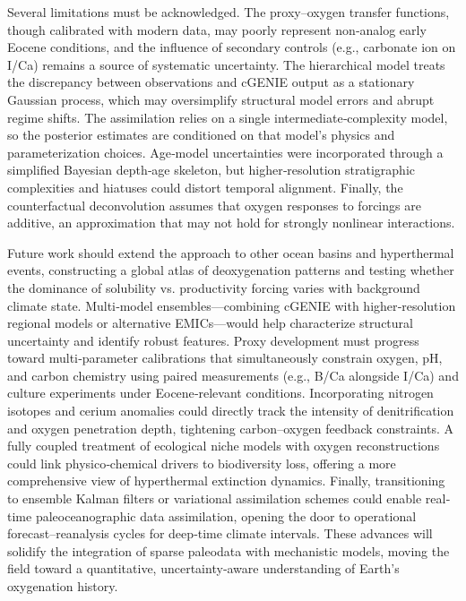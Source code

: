 \documentclass{article}
\begin{document}
Several limitations must be acknowledged. The proxy–oxygen transfer functions, though calibrated with modern data, may poorly represent non‐analog early Eocene conditions, and the influence of secondary controls (e.g., carbonate ion on I/Ca) remains a source of systematic uncertainty. The hierarchical model treats the discrepancy between observations and cGENIE output as a stationary Gaussian process, which may oversimplify structural model errors and abrupt regime shifts. The assimilation relies on a single intermediate‐complexity model, so the posterior estimates are conditioned on that model’s physics and parameterization choices. Age‐model uncertainties were incorporated through a simplified Bayesian depth‐age skeleton, but higher‐resolution stratigraphic complexities and hiatuses could distort temporal alignment. Finally, the counterfactual deconvolution assumes that oxygen responses to forcings are additive, an approximation that may not hold for strongly nonlinear interactions.

Future work should extend the approach to other ocean basins and hyperthermal events, constructing a global atlas of deoxygenation patterns and testing whether the dominance of solubility vs. productivity forcing varies with background climate state. Multi‐model ensembles—combining cGENIE with higher‐resolution regional models or alternative EMICs—would help characterize structural uncertainty and identify robust features. Proxy development must progress toward multi‐parameter calibrations that simultaneously constrain oxygen, pH, and carbon chemistry using paired measurements (e.g., B/Ca alongside I/Ca) and culture experiments under Eocene‐relevant conditions. Incorporating nitrogen isotopes and cerium anomalies could directly track the intensity of denitrification and oxygen penetration depth, tightening carbon–oxygen feedback constraints. A fully coupled treatment of ecological niche models with oxygen reconstructions could link physico‐chemical drivers to biodiversity loss, offering a more comprehensive view of hyperthermal extinction dynamics. Finally, transitioning to ensemble Kalman filters or variational assimilation schemes could enable real‐time paleoceanographic data assimilation, opening the door to operational forecast–reanalysis cycles for deep‐time climate intervals. These advances will solidify the integration of sparse paleodata with mechanistic models, moving the field toward a quantitative, uncertainty‐aware understanding of Earth’s oxygenation history.



\end{document}
